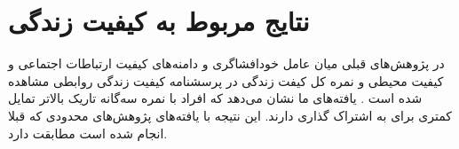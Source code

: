 \section{
  نتایج مربوط به کیفیت زندگی
 }
در پژوهش‌های قبلی میان عامل خود‌افشاگری و
دامنه‌های کیفیت ارتباطات اجتماعی و کیفیت محیطی و
نمره کل کیفت زندگی در پرسشنامه کیفیت زندگی روابطی مشاهده شده است
\!\citep{chandraRelationshipPsychologicalMorbidity2003}
\!.
یافته‌های ما نشان می‌دهد که افراد با نمره سه‌گانه تاریک بالاتر تمایل کمتری برای به اشتراک گذاری دارند.
این نتیجه با یافته‌های پژوهش‌های محدودی که قبلا انجام  شده است مطابقت دارد.


